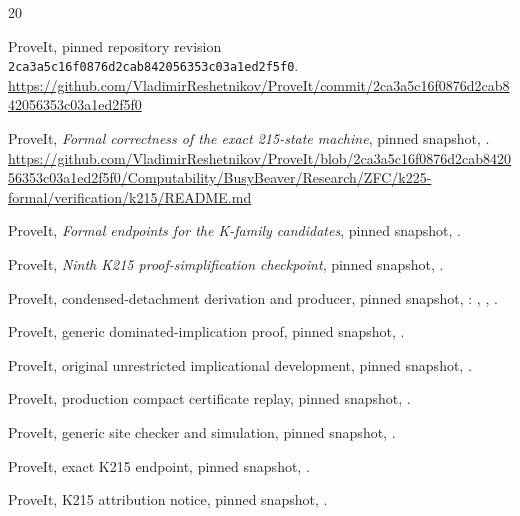 \documentclass[11pt,letterpaper]{article}
\newcommand{\sha}{\texttt{2ca3a5c16f0876d2cab842056353c03a1ed2f5f0}}
\begin{document}
\begin{thebibliography}{20}
\raggedright
{} ProveIt, pinned repository revision
\sha.\newline
\url{https://github.com/VladimirReshetnikov/ProveIt/commit/2ca3a5c16f0876d2cab842056353c03a1ed2f5f0}

 ProveIt, \emph{Formal correctness of the exact 215-state
machine}, pinned snapshot,\newline
{}.
\url{https://github.com/VladimirReshetnikov/ProveIt/blob/2ca3a5c16f0876d2cab842056353c03a1ed2f5f0/Computability/BusyBeaver/Research/ZFC/k225-formal/verification/k215/README.md}

 ProveIt, \emph{Formal endpoints for the K-family
candidates}, pinned snapshot, .

 ProveIt, \emph{Ninth K215 proof-simplification checkpoint},
pinned snapshot,\newline
{}.

 ProveIt, condensed-detachment derivation and producer,
pinned snapshot, :
, , .

 ProveIt, generic dominated-implication proof, pinned snapshot,
.

 ProveIt, original unrestricted implicational development,
pinned snapshot,\newline
{}.

 ProveIt, production compact certificate replay, pinned
snapshot,\newline
{}.

 ProveIt, generic site checker and simulation, pinned snapshot,
.

 ProveIt, exact K215 endpoint, pinned snapshot,
.

 ProveIt, K215 attribution notice, pinned snapshot,
.
\end{thebibliography}
\end{document}
